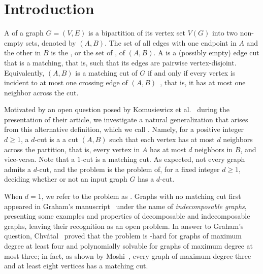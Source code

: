 \section{Introduction}
\label{sec:intro}

 A  of a graph $G = (V, E)$ is a bipartition of its vertex set $V(G)$ into two non-empty sets, denoted by $(A,B)$.
The set of all edges with one endpoint in $A$ and the other in $B$ is the , or the set of , of $(A,B)$.
A  is a (possibly empty) edge cut that is a matching, that is, such that its edges are pairwise vertex-disjoint. Equivalently, $(A, B)$ is a matching cut of $G$ if and only if every vertex is incident to at most one crossing edge of $(A, B)$~\cite{matching_cut_graham, chvatal_matching_cut}, that is, it has at most one neighbor across the cut.

Motivated by an open question posed by Komusiewicz et al.~\cite{matching_cut_ipec} during the presentation of their article,  we investigate a natural generalization that arises from this alternative definition, which we call . 
Namely, for a positive integer $d \geq 1$, a $d$-cut is a a cut $(A, B)$ such that each vertex has at most $d$ neighbors across the partition, that is, every vertex in $A$ has at most $d$ neighbors in $B$, and vice-versa. Note that a $1$-cut is a matching cut.
As expected, not every graph admits a $d$-cut, and the  problem is the problem of, for a fixed integer $d \geq 1$, deciding whether or not an input graph $G$ has a $d$-cut.


When $d=1$, we refer to the problem as .
Graphs with no matching cut first appeared in Graham's manuscript~\cite{matching_cut_graham} under the name of \textit{indecomposable graphs}, presenting some examples and properties of decomposable and indecomposable graphs, leaving their recognition as an open problem.
In answer to Graham's question, Chv\'atal~\cite{chvatal_matching_cut} proved that the problem is \NP-hard for graphs of maximum degree at least four and polynomially solvable for graphs of maximum degree at most three; in fact, as shown by Moshi~\cite{matching_cut_moshi}, every graph of maximum degree three and at least eight vertices has a matching cut.

